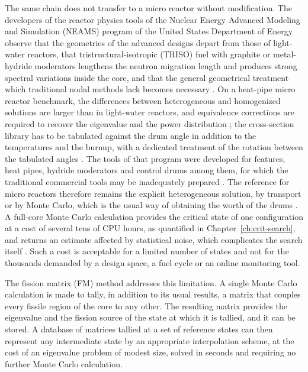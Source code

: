 The same chain does not transfer to a micro reactor without modification. The
developers of the reactor physics tools of the Nuclear Energy Advanced
Modeling and Simulation (NEAMS) program of the United States Department of
Energy observe that the geometries of the advanced designs depart from those
of light-water reactors, that tristructural-isotropic (TRISO) fuel with
graphite or metal-hydride moderators lengthens the neutron migration length
and produces strong spectral variations inside the core, and that the general
geometrical treatment which traditional nodal methods lack becomes necessary
\cite{Wang2025griffin}. On a heat-pipe micro reactor benchmark, the differences
between heterogeneous and homogenized solutions are larger than in light-water
reactors, and equivalence corrections are required to recover the eigenvalue
and the power distribution \cite{Pandya2022}; the cross-section library has to
be tabulated against the drum angle in addition to the temperatures and the
burnup, with a dedicated treatment of the rotation between the tabulated
angles \cite{Roskoff2022physor}. The tools of that program were developed for
features, heat pipes, hydride moderators and control drums among them, for
which the traditional commercial tools may be inadequately prepared
\cite{Stauff2024}. The reference for micro reactors therefore remains the
explicit heterogeneous solution, by transport \cite{Stauff2024} or by Monte
Carlo, which is the usual way of obtaining the worth of the drums
\cite{PriceANE2022}. A full-core Monte Carlo calculation provides the critical
state of one configuration at a cost of several tens of CPU hours, as
quantified in Chapter~\ref{ch:crit-search}, and returns an estimate affected
by statistical noise, which complicates the search itself
\cite{PriceRoskoffPNE2023}. Such a cost is acceptable for a limited number of
states and not for the thousands demanded by a design space, a fuel cycle or
an online monitoring tool.

The fission matrix (FM) method \cite{CarneyANE2014} addresses this limitation.
A single Monte Carlo calculation is made to tally, in addition to its usual
results, a matrix that couples every fissile region of the core to any other.
The resulting matrix provides the eigenvalue and the fission source of the state at
which it is tallied, and it can be stored. A database of matrices tallied at a
set of reference states can then represent any intermediate state by
an appropriate interpolation scheme, at the cost of an eigenvalue problem of modest size, solved in seconds and
requiring no further Monte Carlo calculation.

